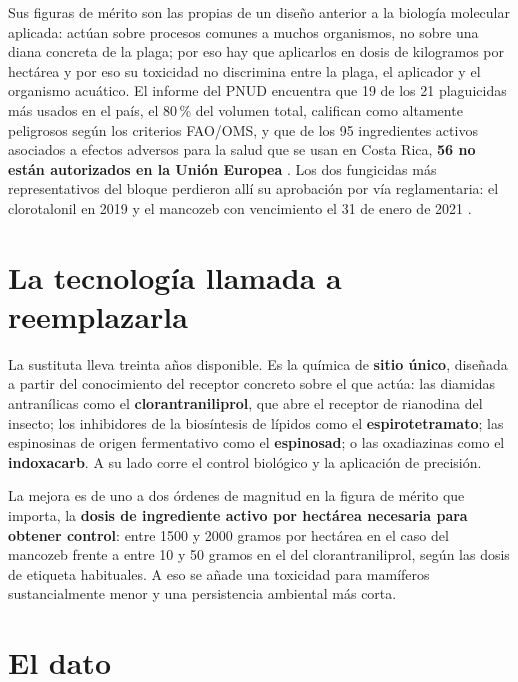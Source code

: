 \documentclass[11pt,letterpaper]{article}
\begin{document}
Sus figuras de mérito \parencite{deweck2022} son las propias de un diseño
anterior a la biología molecular aplicada: actúan sobre procesos comunes a
muchos organismos, no sobre una diana concreta de la plaga; por eso hay que
aplicarlos en dosis de kilogramos por hectárea y por eso su toxicidad no
discrimina entre la plaga, el aplicador y el organismo acuático. El informe del
PNUD encuentra que 19 de los 21 plaguicidas más usados en el país, el 80\,\% del
volumen total, califican como altamente peligrosos según los criterios FAO/OMS,
y que de los 95 ingredientes activos asociados a efectos adversos para la salud
que se usan en Costa Rica, \textbf{56 no están autorizados en la Unión Europea}
\parencite{vargas2021}. Los dos fungicidas más representativos del bloque
perdieron allí su aprobación por vía reglamentaria: el clorotalonil en 2019 y el
mancozeb con vencimiento el 31 de enero de 2021
\parencite{ue2019677,ue20202087}.

\section{La tecnología llamada a reemplazarla}

La sustituta lleva treinta años disponible. Es la química de \textbf{sitio
único}, diseñada a partir del conocimiento del receptor concreto sobre el que
actúa: las diamidas antranílicas como el \textbf{clorantraniliprol}, que abre el
receptor de rianodina del insecto; los inhibidores de la biosíntesis de lípidos
como el \textbf{espirotetramato}; las espinosinas de origen fermentativo como el
\textbf{espinosad}; o las oxadiazinas como el \textbf{indoxacarb}. A su lado
corre el control biológico y la aplicación de precisión.

La mejora es de uno a dos órdenes de magnitud en la figura de mérito que importa,
la \textbf{dosis de ingrediente activo por hectárea necesaria para obtener
control}: entre \num{1500} y \num{2000} gramos por hectárea en el caso del
mancozeb frente a entre 10 y 50 gramos en el del clorantraniliprol, según las
dosis de etiqueta habituales. A eso se añade una toxicidad para mamíferos
sustancialmente menor y una persistencia ambiental más corta.

\section{El dato}
\end{document}
